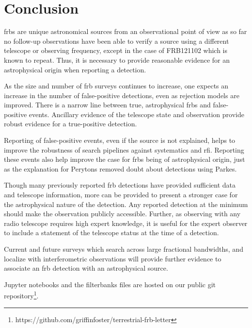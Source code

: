 \documentclass[a4paper,fleqn,usenatbib]{mnras}
\begin{document}
\section{Conclusion}

\glspl{frb} are unique astronomical sources from an observational point of view
as so far no follow-up observations have been able to verify a source using a
different telescope or observing frequency, except in the case of FRB121102
which is known to repeat. Thus, it is necessary to provide reasonable evidence
for an astrophysical origin when reporting a detection. 

As the size and number of \gls{frb} surveys continues to increase, one expects
an increase in the number of false-positive detections, even as rejection models
are improved. There is a narrow line between true, astrophysical \glspl{frb} and
false-positive events. Ancillary evidence of the telescope state and observation
provide robust evidence for a true-positive detection. 

Reporting of false-positive events, even if the source is not explained, helps
to improve the robustness of search pipelines against systematics and \gls{rfi}.
Reporting these events also help improve the case for \glspl{frb} being of
astrophysical origin, just as the explanation for Perytons
\citep{2015MNRAS.451.3933P} removed doubt about detections using Parkes.

Though many previously reported \gls{frb} detections have provided sufficient
data and telescope information, more can be provided to present a stronger case
for the astrophysical nature of the detection. Any reported detection at the
minimum should make the observation publicly accessible. Further, as
observing with any radio telescope requires high expert knowledge, it is useful
for the expert observer to include a statement of the telescope status at the
time of a detection.

Current and future surveys which search across large fractional bandwidths, and
localize with interferometric observations will provide further evidence to
associate an \gls{frb} detection with an astrophysical source.

Jupyter notebooks and the filterbanks files are hosted on our
public git
repository\footnote{https://github.com/griffinfoster/terrestrial-frb-letter}.


 

\bsp	%
\label{lastpage}
\end{document}
